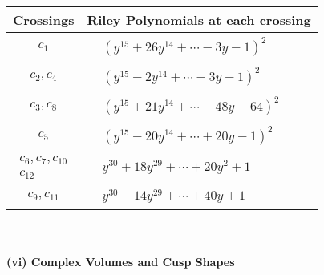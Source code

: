 \documentclass[1p]{elsarticle_modified}
\theoremstyle{definition}
\begin{document}
\begin{tabular}{m{50pt}|m{274pt}}
Crossings & \hspace{64pt}Riley Polynomials at each crossing \\
\hline $$\begin{aligned}c_{1}\end{aligned}$$&$\begin{aligned}
&(y^{15}+26 y^{14}+\cdots-3 y-1)^{2}
\end{aligned}$\\
\hline $$\begin{aligned}c_{2},c_{4}\end{aligned}$$&$\begin{aligned}
&(y^{15}-2 y^{14}+\cdots-3 y-1)^{2}
\end{aligned}$\\
\hline $$\begin{aligned}c_{3},c_{8}\end{aligned}$$&$\begin{aligned}
&(y^{15}+21 y^{14}+\cdots-48 y-64)^{2}
\end{aligned}$\\
\hline $$\begin{aligned}c_{5}\end{aligned}$$&$\begin{aligned}
&(y^{15}-20 y^{14}+\cdots+20 y-1)^{2}
\end{aligned}$\\
\hline $$\begin{aligned}c_{6},c_{7},c_{10}\\c_{12}\end{aligned}$$&$\begin{aligned}
&y^{30}+18 y^{29}+\cdots+20 y^2+1
\end{aligned}$\\
\hline $$\begin{aligned}c_{9},c_{11}\end{aligned}$$&$\begin{aligned}
&y^{30}-14 y^{29}+\cdots+40 y+1
\end{aligned}$\\
\hline
\end{tabular}\\~\\
\newpage\flushleft \textbf{(vi) Complex Volumes and Cusp Shapes}
\end{document}
